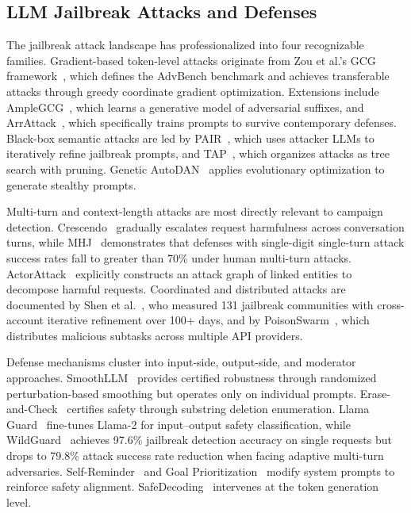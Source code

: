 \documentclass[journal]{IEEEtran}
\theoremstyle{plain}
\theoremstyle{definition}
\theoremstyle{remark}
\begin{document}
\subsection{LLM Jailbreak Attacks and Defenses}

The jailbreak attack landscape has professionalized into four recognizable families. Gradient-based token-level attacks originate from Zou et al.'s GCG framework~\cite{zou2023gcg}, which defines the AdvBench benchmark and achieves transferable attacks through greedy coordinate gradient optimization. Extensions include AmpleGCG~\cite{liao2024amplecgc}, which learns a generative model of adversarial suffixes, and ArrAttack~\cite{li2025arrattack}, which specifically trains prompts to survive contemporary defenses. Black-box semantic attacks are led by PAIR~\cite{chao2023pair}, which uses attacker LLMs to iteratively refine jailbreak prompts, and TAP~\cite{mehrotra2024tap}, which organizes attacks as tree search with pruning. Genetic AutoDAN~\cite{liu2024autodan} applies evolutionary optimization to generate stealthy prompts.

Multi-turn and context-length attacks are most directly relevant to campaign detection. Crescendo~\cite{russinovich2024crescendo} gradually escalates request harmfulness across conversation turns, while MHJ~\cite{li2024mhj} demonstrates that defenses with single-digit single-turn attack success rates fall to greater than 70\% under human multi-turn attacks. ActorAttack~\cite{ren2024actorattack} explicitly constructs an attack graph of linked entities to decompose harmful requests. Coordinated and distributed attacks are documented by Shen et al.~\cite{shen2024dan}, who measured 131 jailbreak communities with cross-account iterative refinement over 100+ days, and by PoisonSwarm~\cite{yan2025poisonswarm}, which distributes malicious subtasks across multiple API providers.

Defense mechanisms cluster into input-side, output-side, and moderator approaches. SmoothLLM~\cite{robey2024smoothllm} provides certified robustness through randomized perturbation-based smoothing but operates only on individual prompts. Erase-and-Check~\cite{kumar2024erasecheck} certifies safety through substring deletion enumeration. Llama Guard~\cite{inan2023llamaguard} fine-tunes Llama-2 for input--output safety classification, while WildGuard~\cite{han2024wildguard} achieves 97.6\% jailbreak detection accuracy on single requests but drops to 79.8\% attack success rate reduction when facing adaptive multi-turn adversaries. Self-Reminder~\cite{xie2023selfreminder} and Goal Prioritization~\cite{zhang2024goalpriority} modify system prompts to reinforce safety alignment. SafeDecoding~\cite{xu2024safedecoding} intervenes at the token generation level.
\end{document}
